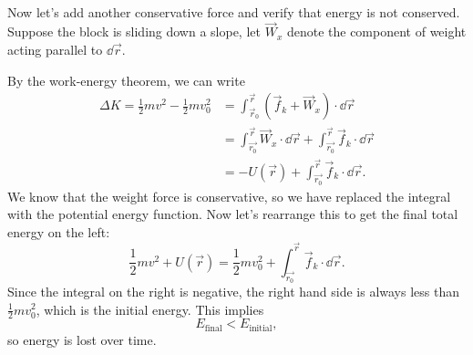 \documentclass[../classical_mechanics.tex]{subfiles}
\begin{document}
        \paragraph{}
        Now let's add another conservative force and verify that energy is not conserved.
        Suppose the block is sliding down a slope, let $\vec{W}_x$ denote the component of weight acting parallel to $\dd{\vec{r}}$.
        \begin{figure}[H]
            \centering
        \end{figure}
        By the work-energy theorem, we can write
        \begin{align}
            \Delta K=\frac{1}{2}mv^2-\frac{1}{2}mv_0^2&=\int_{\vec{r}_0}^{\vec{r}}(\vec{f}_k+\vec{W}_x)\cdot\dd{\vec{r}}\\
            &=\int_{\vec{r_0}}^{\vec{r}}\vec{W}_x\cdot\dd{\vec{r}}+\int_{\vec{r_0}}^{\vec{r}}\vec{f}_k\cdot\dd{\vec{r}}\\
            &=-U(\vec{r})+\int_{\vec{r_0}}^{\vec{r}}\vec{f}_k\cdot\dd{\vec{r}}.
        \end{align}
        We know that the weight force is conservative, so we have replaced the integral with the potential energy function.
        Now let's rearrange this to get the final total energy on the left:
        \begin{equation}
            \frac{1}{2}mv^2+U(\vec{r})=\frac{1}{2}mv_0^2+\int_{\vec{r_0}}^{\vec{r}}\vec{f}_k\cdot\dd{\vec{r}}.
        \end{equation}
        Since the integral on the right is negative, the right hand side is always less than $\frac{1}{2}mv_0^2$, which is the initial energy.
        This implies
        \begin{equation}
            E_\text{final}<E_\text{initial},
        \end{equation}
        so energy is lost over time.
\end{document}
